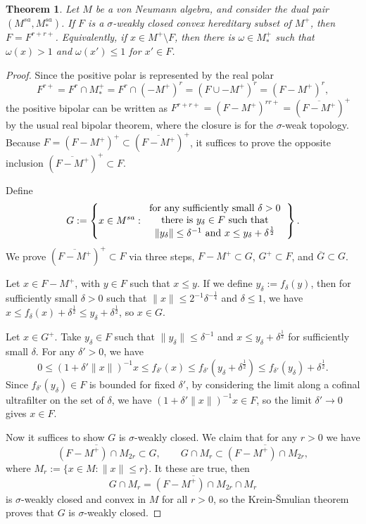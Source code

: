 \documentclass[noamsfonts,a4paper,10pt]{amsart}
\theoremstyle{plain}
\newtheorem{thm}{Theorem}[section]
\theoremstyle{definition}
\theoremstyle{remark}
\begin{document}
\begin{thm}\label{1}
Let $M$ be a von Neumann algebra, and consider the dual pair $(M^{sa},M_*^{sa})$.
If $F$ is a $\sigma$-weakly closed convex hereditary subset of $M^+$, then $F=F^{r+r+}$.
Equivalently, if $x\in M^+\setminus F$, then there is $\omega\in M_*^+$ such that $\omega(x)>1$ and $\omega(x')\le1$ for $x'\in F$.
\end{thm}
\begin{proof}
Since the positive polar is represented by the real polar
\[F^{r+}=F^r\cap M_*^+=F^r\cap(-M^+)^r=(F\cup-M^+)^r=(F-M^+)^r,\]
the positive bipolar can be written as $F^{r+r+}=(F-M^+)^{rr+}=(\overline{F-M^+})^+$ by the usual real bipolar theorem, where the closure is for the $\sigma$-weak topology.
Because $F=(F-M^+)^+\subset(\overline{F-M^+})^+$, it suffices to prove the opposite inclusion $(\overline{F-M^+})^+\subset F$.

Define
\[G:=\left\{x\in M^{sa}:\begin{tabular}{c}
for any sufficiently small $\delta>0$\\
there is $y_\delta\in F$ such that\\
$\|y_\delta\|\le\delta^{-1}$ and $x\le y_\delta+\delta^{\frac12}$\\
\end{tabular}\right\}.\]
We prove $(\overline{F-M^+})^+\subset F$ via three steps, $F-M^+\subset G$, $G^+\subset F$, and $\overline G\subset G$.

Let $x\in F-M^+$, with $y\in F$ such that $x\le y$.
If we define $y_\delta:=f_\delta(y)$, then for sufficiently small $\delta>0$ such that $\|x\|\le2^{-1}\delta^{-\frac14}$ and $\delta\le1$, we have $x\le f_\delta(x)+\delta^{\frac12}\le y_\delta+\delta^{\frac12}$, so $x\in G$.

Let $x\in G^+$.
Take $y_\delta\in F$ such that $\|y_\delta\|\le\delta^{-1}$ and $x\le y_\delta+\delta^{\frac12}$ for sufficiently small $\delta$.
For any $\delta'>0$, we have
\[0\le(1+\delta'\|x\|)^{-1}x\le f_{\delta'}(x)\le f_{\delta'}(y_\delta+\delta^{\frac12})\le f_{\delta'}(y_\delta)+\delta^{\frac12}.\]
Since $f_{\delta'}(y_\delta)\in F$ is bounded for fixed $\delta'$, by considering the limit along a cofinal ultrafilter on the set of $\delta$, we have $(1+\delta'\|x\|)^{-1}x\in F$, so the limit $\delta'\to0$ gives $x\in F$.

Now it suffices to show $G$ is $\sigma$-weakly closed.
We claim that for any $r>0$ we have
\[\overline{(F-M^+)\cap M_{2r}}\subset G,\qquad G\cap M_r\subset\overline{(F-M^+)\cap M_{2r}},\]
where $M_r:=\{x\in M:\|x\|\le r\}$.
It these are true, then
\[G\cap M_r=\overline{(F-M^+)\cap M_{2r}}\cap M_r\]
is $\sigma$-weakly closed and convex in $M$ for all $r>0$, so the Krein-\v Smulian theorem proves that $G$ is $\sigma$-weakly closed.


\end{proof}
\end{document}
